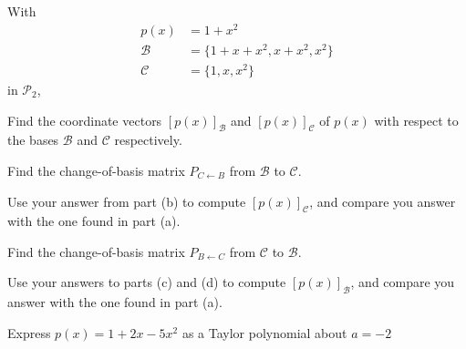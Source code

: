 \documentclass[oneperpage]{gsypset}
\begin{document}
	\begin{problem}[6.3.7]
		With
		\begin{align*}
			p(x) &= 1 + x^2 \\
			\mathcal{B} &= \{1+x+x^2, x+x^2, x^2\} \\
			\mathcal{C} &= \{1,x,x^2\}
		\end{align*}
		in $\mathscr{P}_2$,
		\begin{subproblems}[(a)]
			\subproblem
				Find the coordinate vectors $[p(x)]_\mathcal{B}$ and $[p(x)]_\mathcal{C}$
				of $p(x)$ with respect to the bases $\mathcal{B}$ and $\mathcal{C}$ respectively.
				\begin{solution}
					
				\end{solution}
				
			\subproblem
				Find the change-of-basis matrix $P_{C \leftarrow B}$ from $\mathcal{B}$ to $\mathcal{C}$.
				\begin{solution}
					
				\end{solution}
				
			\subproblem
				Use your answer from part (b) to compute $[p(x)]_\mathcal{C}$, 
				and compare you answer with the one found in part (a).
				\begin{solution}
					
				\end{solution}
				
			\subproblem
				Find the change-of-basis matrix $P_{B \leftarrow C}$ from $\mathcal{C}$ to $\mathcal{B}$.
				\begin{solution}
					
				\end{solution}
				
			\subproblem
				Use your answers to parts (c) and (d) to compute $[p(x)]_\mathcal{B}$, 
				and compare you answer with the one found in part (a).
				\begin{solution}
					
				\end{solution}
		\end{subproblems}
	\end{problem}
	
	\begin{problem}[6.3.18]
		Express $p(x)=1 + 2x - 5x^2$ as a Taylor polynomial about $a = -2$
	\end{problem}
	\begin{solution}
		
	\end{solution}
	
\end{document}

